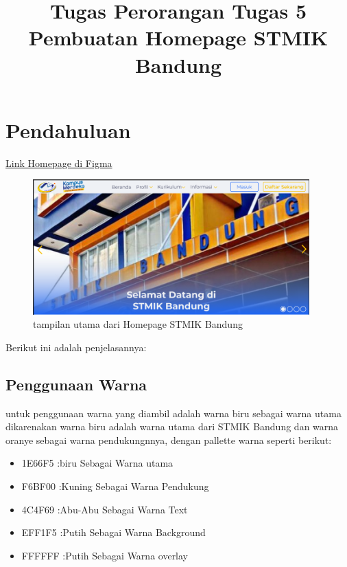 \documentclass[a4paper, 12pt]{article}
\title{\textbf{Tugas Perorangan}\linebreak
\textbf{Tugas 5 Pembuatan Homepage STMIK Bandung}\linebreak}
\date{}
\begin{document}


\setcounter{page}{1}
\section{Pendahuluan}
\href{https://www.figma.com/design/BTp5GY5lXf63dsjMJ1upku/Homepage?node-id=0-1&t=ly0hrx6yfXIWkYsS-1}{Link Homepage di Figma}\newline
\begin{figure}[h]
  \begin{center}
    \includegraphics[width=0.95\textwidth]{images/gambar1.png}
  \end{center}
  \caption{tampilan utama dari Homepage STMIK Bandung}\label{fig:stmik}
\end{figure}
Berikut ini adalah penjelasannya:
\subsection{Penggunaan Warna}
untuk penggunaan warna yang diambil adalah warna biru sebagai warna utama dikarenakan warna biru adalah warna utama dari STMIK Bandung dan warna oranye sebagai warna pendukungnnya, dengan pallette warna seperti berikut:
\begin{itemize}
  \item \textcolor{biru}{1E66F5 :biru} Sebagai Warna utama
  \item \textcolor{kuning}{F6BF00 :Kuning} Sebagai Warna Pendukung
  \item \textcolor{abu}{4C4F69 :Abu-Abu} Sebagai Warna Text
  \item EFF1F5 :Putih Sebagai Warna Background
  \item FFFFFF :Putih Sebagai Warna overlay
\end{itemize}
\end{document}
